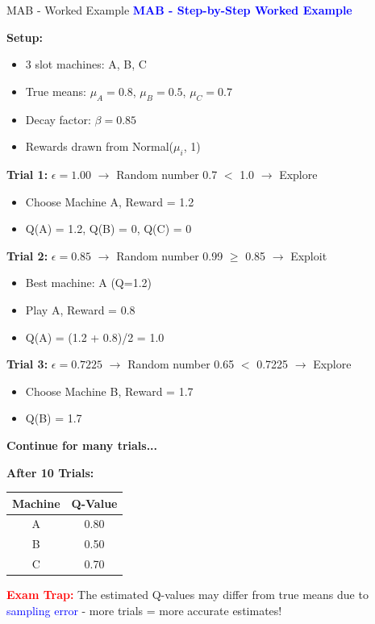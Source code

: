 \documentclass[8pt]{beamer}
\begin{document}
	\begin{frame}{MAB - Worked Example}
		\fontsize{6.5}{7.5}\selectfont
		\textcolor{blue}{\textbf{MAB - Step-by-Step Worked Example}}
		
		\textbf{Setup:}
		\begin{itemize}
			\item 3 slot machines: A, B, C
			\item True means: $\mu_A = 0.8$, $\mu_B = 0.5$, $\mu_C = 0.7$
			\item Decay factor: $\beta = 0.85$
			\item Rewards drawn from Normal($\mu_i$, 1)
		\end{itemize}
		
		\textbf{Trial 1:} $\epsilon = 1.00$ $\rightarrow$ Random number 0.7 $<$ 1.0 $\rightarrow$ Explore
		\begin{itemize}
			\item Choose Machine A, Reward = 1.2
			\item Q(A) = 1.2, Q(B) = 0, Q(C) = 0
		\end{itemize}
		
		\textbf{Trial 2:} $\epsilon = 0.85$ $\rightarrow$ Random number 0.99 $\ge$ 0.85 $\rightarrow$ Exploit
		\begin{itemize}
			\item Best machine: A (Q=1.2)
			\item Play A, Reward = 0.8
			\item Q(A) = (1.2 + 0.8)/2 = 1.0
		\end{itemize}
		
		\textbf{Trial 3:} $\epsilon = 0.7225$ $\rightarrow$ Random number 0.65 $<$ 0.7225 $\rightarrow$ Explore
		\begin{itemize}
			\item Choose Machine B, Reward = 1.7
			\item Q(B) = 1.7
		\end{itemize}
		
		\textbf{Continue for many trials...}
		
		\textbf{After 10 Trials:}
		\begin{tabular}{|c|c|}
			\hline
			\textbf{Machine} & \textbf{Q-Value} \\
			\hline
			A & 0.80 \\
			\hline
			B & 0.50 \\
			\hline
			C & 0.70 \\
			\hline
		\end{tabular}
		
		\textcolor{red}{\textbf{Exam Trap:}} The estimated Q-values may differ from true means due to \textcolor{blue}{sampling error} - more trials = more accurate estimates!
	\end{frame}
	
\end{document}
